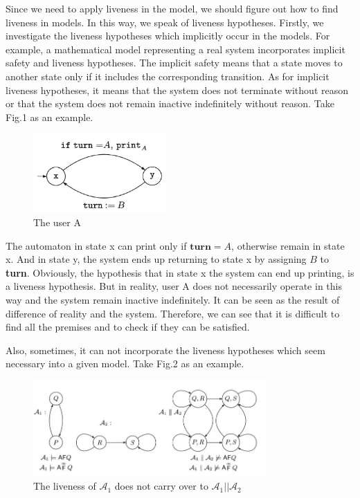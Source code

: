 \documentclass{acmtog} %
\begin{document}
    Since we need to apply liveness in the model, we should figure out how to find liveness in models. In this way, we speak of liveness hypotheses. Firstly, we investigate the liveness hypotheses which implicitly occur in the models. For example, a mathematical model representing a real system incorporates implicit safety and liveness hypotheses. The implicit safety means that a state moves to another state only if it includes the corresponding transition. As for implicit liveness hypotheses, it means that the system does not terminate without reason or that the system does not remain inactive indefinitely without reason. Take Fig.1 as an example.
    \begin{figure}[H]
      \centering
      \includegraphics[width=2.0in]{1.jpg}
      \caption{The user A}
    \end{figure}

    The automaton in state x can print only if $\textbf{turn} = A$, otherwise remain in state x. And in state y, the system ends up returning to state x by assigning $B$ to \textbf{turn}. Obviously, the hypothesis that in state x the system can end up printing, is a liveness hypothesis. But in reality, user A does not necessarily operate in this way and the system remain inactive indefinitely. It can be seen as the result of difference of reality and the system. Therefore, we can see that it is difficult to find all the premises and to check if they can be satisfied.

    Also, sometimes, it can not incorporate the liveness hypotheses which seem necessary into a given model. Take Fig.2 as an example.
    \begin{figure}[H]
      \centering
      \includegraphics[width=3.5in]{2.jpg}
      \caption{The liveness of $\mathcal{A}_1$ does not carry over to $\mathcal{A}_1||$$\mathcal{A}_2$}
    \end{figure}
    
\end{document}
